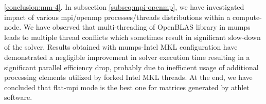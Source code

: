 


	
\ref{conclusion:mm-4}. In subsection \ref{subseq:mpi-openmp}, we have investigated impact of various
\acrshort{mpi}/\acrshort{openmp} processes/threads distributions within a compute-node. We have observed that multi-threading of
OpenBLAS library in \acrshort{mumps} leads to multiple thread conflicts which sometimes result in significant slow-down of the solver. Results obtained with \acrshort{mumps}-Intel MKL configuration have demonstrated a negligible improvement in solver execution time resulting in a significant parallel efficiency drop, probably due to inefficient usage of additional processing elements utilized by forked Intel MKL threads. At the end, we have concluded that flat-\acrshort{mpi} mode is the best one for matrices generated by \acrshort{athlet} software.\\






